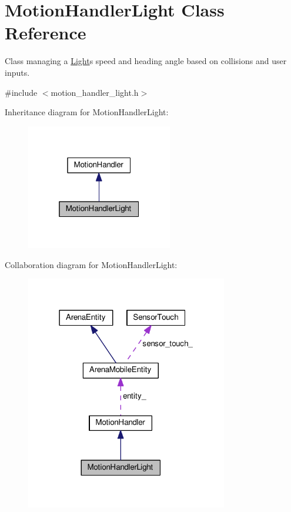 \hypertarget{classMotionHandlerLight}{}\section{Motion\+Handler\+Light Class Reference}
\label{classMotionHandlerLight}


Class managing a \hyperlink{classLight}{Light}\textquotesingle{}s speed and heading angle based on collisions and user inputs.  




{\ttfamily \#include $<$motion\+\_\+handler\+\_\+light.\+h$>$}



Inheritance diagram for Motion\+Handler\+Light\+:\nopagebreak
\begin{figure}[H]
\begin{center}
\leavevmode
\includegraphics[width=181pt]{classMotionHandlerLight__inherit__graph}
\end{center}
\end{figure}


Collaboration diagram for Motion\+Handler\+Light\+:\nopagebreak
\begin{figure}[H]
\begin{center}
\leavevmode
\includegraphics[width=250pt]{classMotionHandlerLight__coll__graph}
\end{center}
\end{figure}
